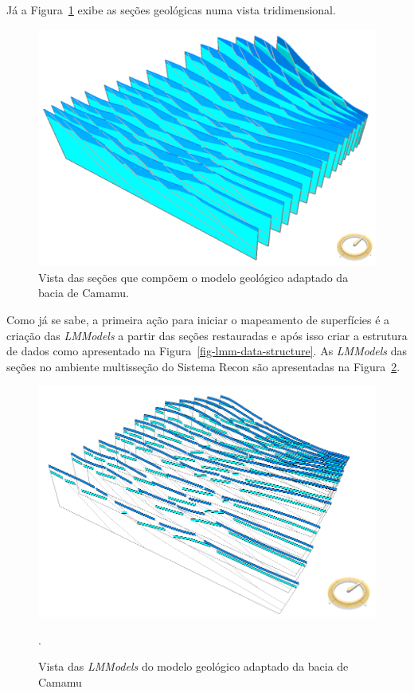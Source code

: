Já a Figura~\ref{fig-example-2-2} exibe as seções geológicas numa vista tridimensional.

\begin{figure} [H]
  \begin{center}
    \includegraphics[width=320pt]{images/fig-example-2-2}
    \caption{Vista das seções que compõem o modelo geológico adaptado da bacia de Camamu.}\label{fig-example-2-2}
  \end{center}
\end{figure}

Como já se sabe, a primeira ação para iniciar o mapeamento de superfícies é a criação das \textit{LMModels} a partir das seções restauradas e após isso criar a estrutura de dados como apresentado na Figura~\ref{fig-lmm-data-structure}. As \textit{LMModels} das seções no ambiente multisseção do Sistema Recon são apresentadas na Figura~\ref{fig-example-2-3}.

\begin{figure} [H]
  \begin{center}
    \includegraphics[width=320pt]{images/fig-lmmodel-ms}
    \caption{Vista das \textit{LMModels} do modelo geológico adaptado da bacia de Camamu}.\label{fig-example-2-3}
  \end{center}
\end{figure}

